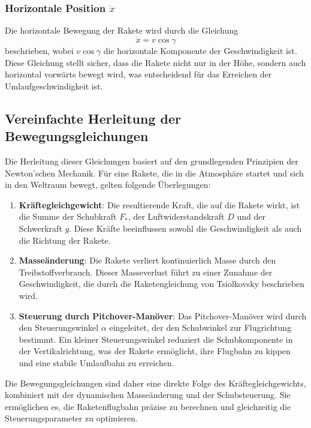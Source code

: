 \subsubsection{Horizontale Position \(\dot{x}\)}
Die horizontale Bewegung der Rakete wird durch die Gleichung
\[
\dot{x} = v \cos \gamma
\]
beschrieben, wobei \(v \cos \gamma\) die horizontale Komponente der Geschwindigkeit ist. 
Diese Gleichung stellt sicher, dass die Rakete nicht nur in der Höhe, sondern auch horizontal vorwärts bewegt wird, was entscheidend für das Erreichen der Umlaufgeschwindigkeit ist.

\subsection{Vereinfachte Herleitung der Bewegungsgleichungen}
Die Herleitung dieser Gleichungen basiert auf den grundlegenden Prinzipien der Newton'schen Mechanik. Für eine Rakete, die in die Atmosphäre startet und sich in den Weltraum bewegt, gelten folgende Überlegungen:

\begin{enumerate}
	\item \textbf{Kräftegleichgewicht}: Die resultierende Kraft, die auf die Rakete wirkt, ist die Summe der Schubkraft \(F_*\), der Luftwiderstandskraft \(D\) und der Schwerkraft \(g\). 
	Diese Kräfte beeinflussen sowohl die Geschwindigkeit als auch die Richtung der Rakete.
	
	\item \textbf{Masseänderung}: Die Rakete verliert kontinuierlich Masse durch den Treibstoffverbrauch. 
	Dieser Masseverlust führt zu einer Zunahme der Geschwindigkeit, die durch die Raketengleichung von Tsiolkovsky beschrieben wird.
	
	\item \textbf{Steuerung durch Pitchover-Manöver}: Das Pitchover-Manöver wird durch den Steuerungswinkel \(\alpha\) eingeleitet, der den Schubwinkel zur Flugrichtung bestimmt. 
	Ein kleiner Steuerungswinkel reduziert die Schubkomponente in der Vertikalrichtung, was der Rakete ermöglicht, ihre Flugbahn zu kippen und eine stabile Umlaufbahn zu erreichen.
\end{enumerate}

Die Bewegungsgleichungen sind daher eine direkte Folge des Kräftegleichgewichts, kombiniert mit der dynamischen Masseänderung und der Schubsteuerung. 
Sie ermöglichen es, die Raketenflugbahn präzise zu berechnen und gleichzeitig die Steuerungsparameter zu optimieren.


